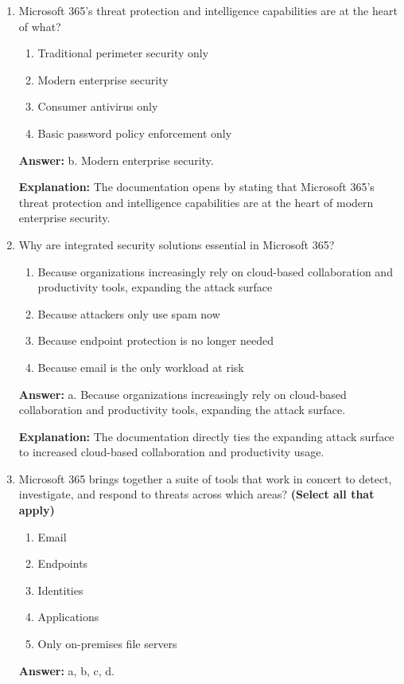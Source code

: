\documentclass[10pt]{article}
\begin{document}
\begin{enumerate}[leftmargin=*]

\item Microsoft 365’s threat protection and intelligence capabilities are at the heart of what?
\begin{enumerate}[label=\alph*., leftmargin=1.5em]
\item Traditional perimeter security only
\item Modern enterprise security
\item Consumer antivirus only
\item Basic password policy enforcement only
\end{enumerate}
\textbf{Answer:} b. Modern enterprise security.

\textbf{Explanation:} The documentation opens by stating that Microsoft 365’s threat protection and intelligence capabilities are at the heart of modern enterprise security.

\item Why are integrated security solutions essential in Microsoft 365?
\begin{enumerate}[label=\alph*., leftmargin=1.5em]
\item Because organizations increasingly rely on cloud-based collaboration and productivity tools, expanding the attack surface
\item Because attackers only use spam now
\item Because endpoint protection is no longer needed
\item Because email is the only workload at risk
\end{enumerate}
\textbf{Answer:} a. Because organizations increasingly rely on cloud-based collaboration and productivity tools, expanding the attack surface.

\textbf{Explanation:} The documentation directly ties the expanding attack surface to increased cloud-based collaboration and productivity usage.

\item Microsoft 365 brings together a suite of tools that work in concert to detect, investigate, and respond to threats across which areas? \textbf{(Select all that apply)}
\begin{enumerate}[label=\alph*., leftmargin=1.5em]
\item Email
\item Endpoints
\item Identities
\item Applications
\item Only on-premises file servers
\end{enumerate}
\textbf{Answer:} a, b, c, d.


\end{enumerate}
\end{document}
